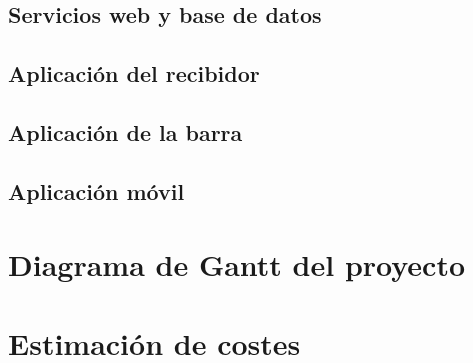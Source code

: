   \subsection{Servicios web y base de datos}
  \subsection{Aplicación del recibidor}
  \subsection{Aplicación de la barra}
  \subsection{Aplicación móvil}

\section{Diagrama de Gantt del proyecto}

\section{Estimación de costes}


